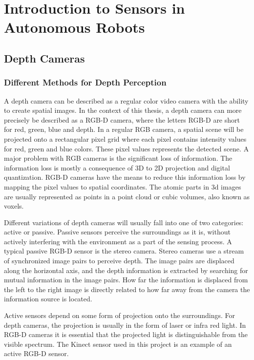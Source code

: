 \section{Introduction to Sensors in Autonomous Robots}

\subsection{Depth Cameras}

\subsubsection{Different Methods for Depth Perception}

A depth camera can be described as a regular color video camera with the ability to create spatial images. In the context of this thesis, a depth camera can  more precisely be described as a RGB-D camera, where the letters RGB-D are short for red, green, blue and depth. In a regular RGB camera, a spatial scene will be projected onto a rectangular pixel grid where each pixel contains intensity values for red, green and blue colors. These pixel values represents the detected scene. A major problem with RGB cameras is the significant loss of information. The information loss is mostly a consequence of 3D to 2D projection and digital quantization. RGB-D cameras have the means to reduce this information loss by mapping the pixel values to spatial coordinates. The atomic parts in 3d images are usually represented as points in a point cloud or cubic volumes, also known as voxels.

Different variations of depth cameras will usually fall into one of two categories: active or passive. Passive sensors perceive the surroundings as it is, without actively interfering with the environment as a part of the sensing process. A typical passive RGB-D sensor is the stereo camera. Stereo cameras use a stream of synchronized image pairs to perceive depth. The image pairs are displaced along the horizontal axis, and the depth information is extracted by searching for mutual information in the image pairs. How far the information is displaced from the left to the right image is directly related to how far away from the camera the information source is located. 

Active sensors depend on some form of projection onto the surroundings. For depth cameras, the projection is usually in the form of laser or infra red light. In RGB-D cameras it is essential that the projected light is distinguishable from the visible spectrum. The Kinect sensor used in this project is an example of an active RGB-D sensor.

